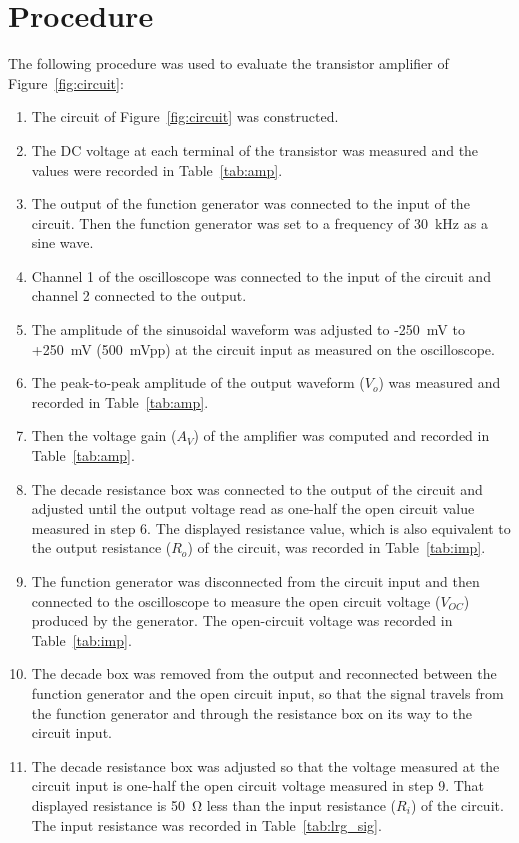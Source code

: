\section{Procedure}
The following procedure was used to evaluate the transistor amplifier of Figure~\ref{fig:circuit}:

\begin{enumerate}
\item The circuit of Figure~\ref{fig:circuit} was constructed.
\item The DC voltage at each terminal of the transistor was measured and the values were recorded in Table~\ref{tab:amp}.
\item The output of the function generator was connected to the input of the circuit. Then the function generator was set to a frequency of \SI{30}{\kilo\hertz} as a sine wave.
\item Channel 1 of the oscilloscope was connected to the input of the circuit and channel 2 connected to the output.
\item The amplitude of the sinusoidal waveform was adjusted to -\SI{250}{mV} to +\SI{250}{mV} (\SI{500}{mVpp}) at the circuit input as measured on the oscilloscope.
\item The peak-to-peak amplitude of the output waveform ($V_o$) was measured and recorded in Table~\ref{tab:amp}.
\item Then the voltage gain ($A_V$) of the amplifier was computed and recorded in Table~\ref{tab:amp}.
\item The decade resistance box was connected to the output of the circuit and adjusted until the output voltage read as one-half the open circuit value measured in step 6. The displayed resistance value, which is also equivalent to the output resistance ($R_o$) of the circuit, was recorded in Table~\ref{tab:imp}.
\item The function generator was disconnected from the circuit input and then connected to the oscilloscope to measure the open circuit voltage ($V_{OC}$) produced by the generator. The open-circuit voltage was recorded in Table~\ref{tab:imp}.
\item The decade box was removed from the output and reconnected between the function generator and the open circuit input, so that the signal travels from the function generator and through the resistance box on its way to the circuit input.
\item The decade resistance box was adjusted so that the voltage measured at the circuit input is one-half the open circuit voltage measured in step 9. That displayed resistance is \SI{50}{\ohm} less than the input resistance ($R_i$) of the circuit. The input resistance was recorded in Table~\ref{tab:lrg_sig}.

\end{enumerate}
